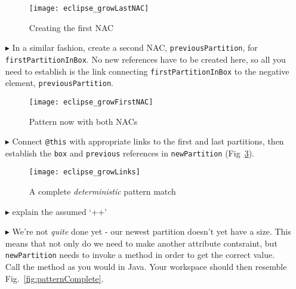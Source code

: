 \begin{itemize}
\begin{figure}[htbp]
\begin{center}
  \texttt{[image: eclipse\_growLastNAC]}
  \caption{Creating the first NAC}
  \label{fig:firstNAC}
\end{center}
\end{figure}

\vspace{0.5cm}

\item[$\blacktriangleright$] In a similar fashion, create a second NAC, \texttt{previousPartition}, for \texttt{firstPartitionInBox}. No new references have to
be created here, so all you need to establish is the link connecting \texttt{firstPartitionInBox} to the negative element, \texttt{previousPartition}.

\begin{figure}[htp]
\begin{center}
  \texttt{[image: eclipse\_growFirstNAC]}
  \caption{Pattern now with both NACs}
  \label{fig:growPatt}
\end{center}
\end{figure}

\item[$\blacktriangleright$] Connect \texttt{@this} with appropriate links to the first and last partitions, then establish the \texttt{box} and
\texttt{previous} references in \texttt{newPartition} (Fig~\ref{fig:growAllLinks}).

\vspace{0.5cm}

\begin{figure}[htp]
\begin{center}
  \texttt{[image: eclipse\_growLinks]}
  \caption{A complete \emph{deterministic} pattern match}
  \label{fig:growAllLinks}
\end{center}
\end{figure}

\item[$\blacktriangleright$] \update explain the assumed `++'

\item[$\blacktriangleright$] We're not \emph{quite} done yet - our newest partition doesn't yet have a size. This means that not only do we need to make
another attribute contsraint, but \texttt{newPartition} needs to invoke a method in order to get the correct value. Call the method as you would in Java. 
Your workspace should then resemble Fig.~\ref{fig:patternComplete}.


\end{itemize}
